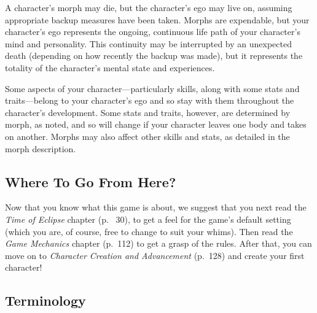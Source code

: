 A character's morph may die, but the character's 
ego may live on, assuming appropriate backup 
measures have been taken. Morphs are expendable, 
but your character's ego represents the ongoing, 
continuous life path of your character's mind and 
personality. This continuity may be interrupted by 
an unexpected death (depending on how recently 
the backup was made), but it represents the totality 
of the character's mental state and experiences.

Some aspects of your character—particularly skills, 
along with some stats and traits—belong to your 
character's ego and so stay with them throughout 
the character's development. Some stats and traits, 
however, are determined by morph, as noted, and so 
will change if your character leaves one body and 
takes on another. Morphs may also affect other skills 
and stats, as detailed in the morph description.

\subsection{Where To Go From Here?}

Now that you know what this game is about, we suggest
that you next read the \textit{Time of Eclipse} chapter
(p.  30), to get a feel for the game's default setting 
(which you are, of course, free to change to suit your 
whims). Then read the \textit{Game Mechanics} chapter 
(p. 112) to get a grasp of the rules. After that, you 
can move on to \textit{Character Creation and Advancement}
(p. 128) and create your first character!

\subsection{Terminology}

